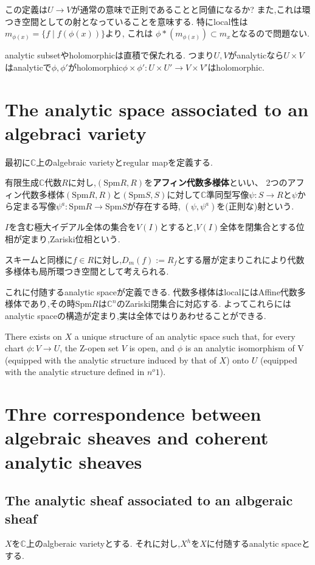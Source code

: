 \begin{rem}
この定義は$U \to V$が通常の意味で正則であることと同値になるか?
また,これは環つき空間としての射となっていることを意味する.
特にlocal性は$m_{\phi(x)} = \{f \mid f(\phi(x))\}$より, これは $\phi*(m_{\phi(x)}) \subset m_{x}$となるので問題ない.
\end{rem}

analytic subsetやholomorphicは直積で保たれる.
つまり$U, V$がanalyticなら$U \times V$はanalyticで$\phi, \phi'$がholomorphic$\phi \times \phi' : U \times U' \to V \times V'$はholomorphic.

\chapter{The analytic space associated to an algebraci variety}
最初に$\mathbb{C}$上のalgebraic varietyとregular mapを定義する.

\begin{screen}
\begin{dfn}
有限生成$\mathbb{C}$代数$R$に対し,$(\mathrm{Spm}R, R)$を\textbf{アフィン代数多様体}といい、
2つのアフィン代数多様体$(\mathrm{Spm}R, R)$と$(\mathrm{Spm}S, S)$に対して$\mathbb{C}$準同型写像$\psi: S \to R$と$\psi$から定まる写像$\psi^a: \mathrm{Spm}R \to \mathrm{Spm}S$が存在する時,
$(\psi, \psi^a)$を(正則な)射という.
\end{dfn}
\end{screen}
$I$を含む極大イデアル全体の集合を$V(I)$とすると,$V(I)$全体を閉集合とする位相が定まり,Zariski位相という.

\begin{rem}
  スキームと同様に$f \in R$に対し,$D_m(f):= R_f$とする層が定まりこれにより代数多様体も局所環つき空間として考えられる.
\end{rem}

これに付随するanalytic spaceが定義できる.
代数多様体はlocalにはAffine代数多様体であり,その時$\mathrm{Spm}R$は$\mathbb{C}^n$のZariski閉集合に対応する.
よってこれらにはanalytic spaceの構造が定まり,実は全体ではりあわせることができる.

\begin{prop}
There exists on $X$ a unique structure of an analytic space such
 that, for every chart $\phi : V \to U$, the Z-open set $V$ is open, and $\phi$ is an analytic
 isomorphism of V (equipped with the analytic structure induced by that of $X$)
 onto $U$ (equipped with the analytic structure defined in $n^o 1$).
\end{prop}

\chapter{Thre correspondence between algebraic sheaves and coherent analytic sheaves}

\section{The analytic sheaf associated to an albgeraic sheaf}
$X$を$\mathbb{C}$上のalgberaic varietyとする.
それに対し,$X^h$を$X$に付随するanalytic spaceとする.
